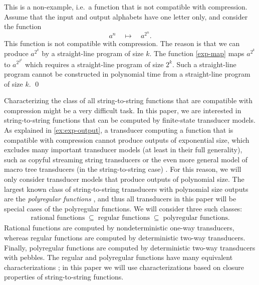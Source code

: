 \documentclass[a4paper,UKenglish,cleveref, autoref, thm-restate]{lipics-v2021}
\begin{document}
\begin{example} \label{ex:exp-output} This is a non-example, i.e.~a function that is not compatible with compression.
    Assume that the input and output alphabets have one letter only, and consider the function 
    \begin{equation} \label{exp-map}
    a^n \quad \mapsto \quad a^{2^n}.
    \end{equation}
    This function is not compatible with compression. The reason is that we can produce $a^{2^k}$ by a straight-line program of size $k$.
    The  function \eqref{exp-map} maps $a^{2^k}$ to $a^{2^{2^k}}$ which requires a straight-line program of size $2^k$. 
    Such a straight-line program cannot be constructed in polynomial time from a straight-line program of size $k$. \qed
\end{example}
Characterizing the class of all string-to-string functions that are compatible with compression might be a very difficult task. In this paper, we are interested in  string-to-string functions that can be computed by finite-state transducer models. As explained in \cref{ex:exp-output}, a transducer computing a function that is compatible with compression 
cannot produce outputs of exponential size, which excludes many important transducer models (at least in their full generality), such as copyful streaming string transducers \cite[Section 2.1]{filiotCopyfulStreamingString2017} or the even more general model of  macro tree transducers (in the string-to-string case) \cite[Section 3.1]{DBLP:journals/jcss/EngelfrietV85}.  For this reason, we will only consider transducer models that produce outputs of polynomial size. The largest known class of string-to-string transducers with polynomial size outputs are the \emph{polyregular functions} \cite{polyregular-survey}, and thus all transducers in this paper will be special cases of the polyregular functions. We will consider three such classes: 
\begin{align*}
\text{rational functions} 
\; \subseteq \; 
\text{regular functions}
\; \subseteq \; 
\text{polyregular functions.}
\end{align*}
Rational functions are computed by nondeterministic one-way transducers, whereas regular functions are computed by deterministic 
two-way transducers. Finally, polyregular functions are computed by deterministic two-way transducers with pebbles. The regular and polyregular
functions have many equivalent characterizations \cite{polyregular-survey}; in this paper we will use characterizations based on closure properties of string-to-string functions.
\end{document}
